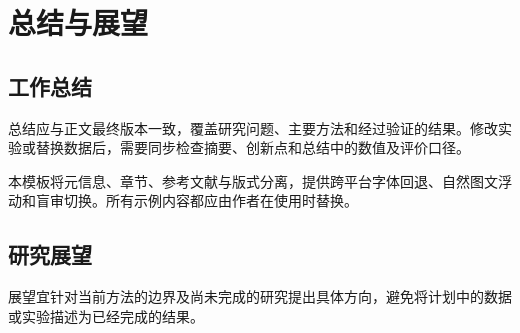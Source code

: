 \chapter{总结与展望}\label{chap:conclusion}
\section{工作总结}
总结应与正文最终版本一致，覆盖研究问题、主要方法和经过验证的结果。修改实验或替换数据后，需要同步检查摘要、创新点和总结中的数值及评价口径。

本模板将元信息、章节、参考文献与版式分离，提供跨平台字体回退、自然图文浮动和盲审切换。所有示例内容都应由作者在使用时替换。

\section{研究展望}
展望宜针对当前方法的边界及尚未完成的研究提出具体方向，避免将计划中的数据或实验描述为已经完成的结果。
